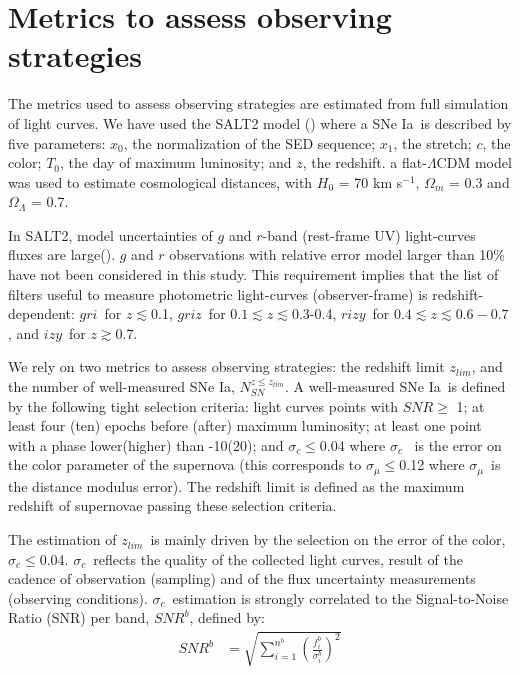 \documentclass[\docopts]{\docclass}
\newcommand{\snrb}{\mbox{$SNR^b$}}
\newcommand{\bg}{{$g$}}
\newcommand{\br}{{$r$}}
\newcommand{\bi}{{$i$}}
\newcommand{\bz}{{$z$}}
\newcommand{\by}{{$y$}}
\newcommand{\snstrech}{\mbox{$x_1$}}
\newcommand{\daymax}{$T_0$}
\newcommand{\sigc}{\mbox{$\sigma_c$}}
\newcommand{\sigmu}{\mbox{$\sigma_\mu$}}
\newcommand{\zlim}{\mbox{$z_{lim}$}}
\newcommand{\sne}{{SNe Ia}}
\newcommand{\nsn}{{$N_{SN}^{z\leq z_{lim}}$}}
\newcommand{\snx}{\mbox{$x_0$}}
\newcommand{\sncolor}{\mbox{$c$}}
\begin{document}
\section{Metrics to assess observing strategies}
\label{sec:metrics}
The metrics used to assess observing strategies are estimated from full simulation of light curves. We have used the SALT2 model (\citealt{Guy_2007,Guy_2010}) where a \sne~is described by five parameters: \snx, the normalization of the SED sequence; \snstrech, the stretch; \sncolor, the color; \daymax, the day of maximum luninosity; and $z$, the redshift. a flat-$\Lambda$CDM model was used to estimate cosmological distances, with $H_0$ = 70 km s$^{-1}$, $\Omega_m$ = 0.3 and $\Omega_\Lambda$ = 0.7.
\par
In SALT2, model uncertainties of $g$ and $r$-band (rest-frame UV) light-curves fluxes are large(\citealt{Guy_2007}). $g$ and $r$ observations with relative error model larger than 10$\%$ have not been considered in this study. This requirement implies that the list of filters useful to measure photometric light-curves (observer-frame) is redshift-dependent: \bg\br\bi~for $z\lesssim$0.1,  \bg\br\bi\bz~for $0.1\lesssim z\lesssim$0.3-0.4, \br\bi\bz\by~for $0.4\lesssim z \lesssim 0.6-0.7$, and \bi\bz\by~for $z\gtrsim 0.7$.
\par
We rely on two metrics to assess observing strategies: the redshift limit \zlim, and the number of well-measured \sne, \nsn. A well-measured \sne~is defined by the following tight selection criteria: light curves points with $SNR\geq$ 1; at least four (ten) epochs before (after) maximum luminosity; at least one point with a phase lower(higher) than -10(20); and \sigc$\leq$0.04 where \sigc~ is the error on the color parameter of the supernova (this corresponds to \sigmu$\leq$0.12 where \sigmu~is the distance modulus error). The redshift limit is defined as the maximum redshift of supernovae passing these selection criteria.
\par
The estimation of \zlim~is mainly driven by the selection on the error of the color, \sigc$\leq$0.04. \sigc~reflects the quality of the collected light curves, result of the cadence of observation (sampling) and of the flux uncertainty measurements (observing conditions). \sigc~estimation is strongly correlated to the Signal-to-Noise Ratio (SNR) per band, \snrb,  defined by:
\begin{equation}
  \begin{aligned}
    SNR^b &= \sqrt{\sum_{i=1}^{n^b}{\left(\frac{f_i^b}{\sigma_i^b}\right)^2}}
    \end{aligned}
  \label{eq:snrb}
\end{equation}
\end{document}
